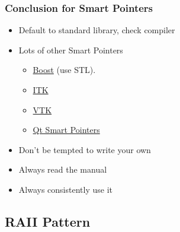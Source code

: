 \begin{Shaded}
\begin{Highlighting}[]
 
\NormalTok{\{}
\NormalTok{:}
   
   
\NormalTok{:}
   
\NormalTok{\};}

 
\NormalTok{\{}
\NormalTok{\}}

 
\NormalTok{\{}
\NormalTok{\}}

\end{Highlighting}
\end{Shaded}

\subsubsection{Conclusion for Smart
Pointers}\label{conclusion-for-smart-pointers}

\begin{itemize}
\itemsep1pt\parskip0pt
\item
  Default to standard library, check compiler
\item
  Lots of other Smart Pointers

  \begin{itemize}
  \itemsep1pt\parskip0pt
  \item
    \href{http://www.boost.org}{Boost} (use STL).
  \item
    \href{http://www.itk.org}{ITK}
  \item
    \href{http://www.vtk.org/Wiki/VTK/Tutorials/SmartPointers}{VTK}
  \item
    \href{https://wiki.qt.io/Smart_Pointers}{Qt Smart Pointers}
  \end{itemize}
\item
  Don't be tempted to write your own
\item
  Always read the manual
\item
  Always consistently use it
\end{itemize}

\subsection{RAII Pattern}\label{raii-pattern}

